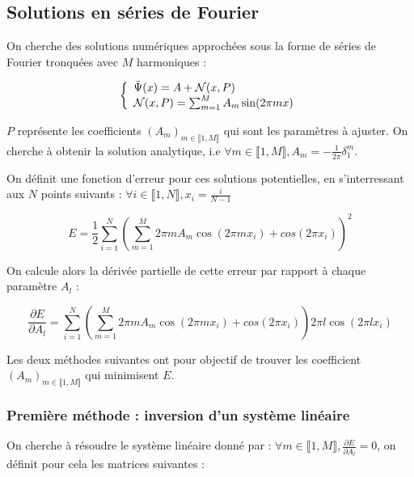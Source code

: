 \documentclass[]{article}
\begin{document}
\subsection{Solutions en séries de Fourier}

On cherche des solutions numériques approchées sous la forme de séries de Fourier tronquées avec $M$ harmoniques :

\begin{equation}
\left\{
    \begin{array}{ll}
        \Tilde{\Psi}(x) = A + {\mathcal{N}}(x,P) \\
        {\mathcal{N}}(x,P) = \sum_{m=1}^{M} A_m \sin(2\pi m x) 
    \end{array}
\right.
\label{eq:solution Fourier}
\end{equation}

$P$ représente les coefficients $(A_m)_{m\in \llbracket 1,M \rrbracket}$ qui sont les paramètres à ajuster.
On cherche à obtenir la solution analytique, i.e $\forall m \in\llbracket 1,M \rrbracket, A_m = -\frac{1}{2\pi}\delta _1 ^m $.

On définit une fonction d'erreur pour ces solutions potentielles, en s'interressant aux $N$ points suivants : $\forall i \in\llbracket 1,N \rrbracket, x_i = \frac{i}{N-1} $

\begin{equation}
    E = \frac{1}{2}\sum_{i=1}^{N}(\sum_{m=1}^{M} 2\pi m A_m \cos(2\pi m x_i)+cos(2\pi x_i))^2 
\label{eq:fonction d'erreur}
\end{equation}

On calcule alors la dérivée partielle de cette erreur par rapport à chaque paramètre $A_l$ :

\begin{equation}
    \frac{\partial E}{\partial A_l} = 
    \sum_{i=1}^{N}(\sum_{m=1}^{M} 2\pi m A_m \cos(2\pi m x_i)+cos(2\pi x_i))
    2\pi l \cos(2\pi l x_i)
\label{eq:gradient}
\end{equation}

Les deux méthodes suivantes ont pour objectif de trouver les coefficient $(A_m)_{m\in \llbracket 1,M \rrbracket}$ qui minimisent $E$.

\subsubsection{Première méthode : inversion d'un système linéaire}

On cherche à résoudre le système linéaire donné par : 
$\forall m \in\llbracket 1,M \rrbracket, \frac{\partial E}{\partial A_l} = 0$, on définit pour cela les matrices suivantes :
\end{document}

